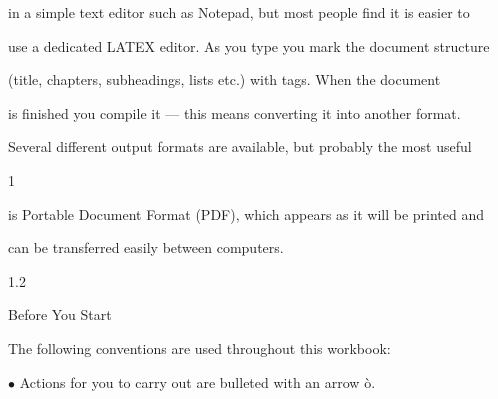 \documentclass[a4paper,portrait,12pt]{article}
\begin{document}
\begin{flushleft}
in a simple text editor such as Notepad, but most people find it is easier to
\end{flushleft}


\begin{flushleft}
use a dedicated LATEX editor. As you type you mark the document structure
\end{flushleft}


\begin{flushleft}
(title, chapters, subheadings, lists etc.) with tags. When the document
\end{flushleft}


\begin{flushleft}
is finished you compile it --- this means converting it into another format.
\end{flushleft}


\begin{flushleft}
Several different output formats are available, but probably the most useful
\end{flushleft}


1





\begin{flushleft}
\newpage
is Portable Document Format (PDF), which appears as it will be printed and
\end{flushleft}


\begin{flushleft}
can be transferred easily between computers.
\end{flushleft}





1.2





\begin{flushleft}
Before You Start
\end{flushleft}





\begin{flushleft}
The following conventions are used throughout this workbook:
\end{flushleft}


\begin{flushleft}
$\bullet$ Actions for you to carry out are bulleted with an arrow \`{o}.
\end{flushleft}
\end{document}
